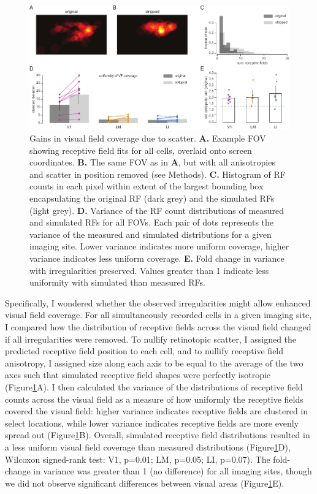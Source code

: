 \begin{figure}[t!]
    \includegraphics[width=\textwidth]{figures/chapter_3/fig_3-6_vf_coverage/fig_3-6_vf_coverage.pdf}
    \vspace{.1in}
    \caption[Compensatory visual field coverage]{Gains in visual field coverage due to scatter. 
    \textbf{A.} Example FOV showing receptive field fits for all cells, overlaid onto screen coordinates.
    \textbf{B.} The same FOV as in \textbf{A}, but with all anisotropies and scatter in position removed (see Methods). 
    \textbf{C.} Histogram of RF counts in each pixel within extent of the largest bounding box encapsulating the original RF (dark grey) and the simulated RFs (light grey).
    \textbf{D.} Variance of the RF count distributions of measured and simulated RFs for all FOVs. Each pair of dots represents the variance of the measured and simulated distributions for a given imaging site. Lower variance indicates more uniform coverage, higher variance indicates less uniform coverage.
    \textbf{E.} Fold change in variance with irregularities preserved. Values greater than 1 indicate less uniformity with simulated than measured RFs.
    \label{fig:vf_coverage}}
\end{figure}

Specifically, I wondered whether the observed irregularities might allow enhanced visual field coverage. For all simultaneously recorded cells in a given imaging site, I compared how the distribution of receptive fields across the visual field changed if all irregularities were removed. To nullify retinotopic scatter, I assigned the predicted receptive field position to each cell, and to nullify receptive field anisotropy, I assigned size along each axis to be equal to the average of the two axes such that simulated receptive field shapes were perfectly isotropic (Figure\ref{fig:vf_coverage}A). I then calculated the variance of the distributions of receptive field counts across the visual field as a measure of how uniformly the receptive fields covered the visual field:  higher variance indicates receptive fields are clustered in select locations, while lower variance indicates receptive fields are more evenly spread out (Figure\ref{fig:vf_coverage}B). Overall, simulated receptive field distributions resulted in a less uniform visual field coverage than measured distributions (Figure\ref{fig:vf_coverage}D), Wilcoxon signed-rank test: V1, p=0.01; LM, p=0.05; LI, p=0.07). The fold-change in variance was greater than 1 (no difference) for all imaging sites, though we did not observe significant differences between visual areas (Figure\ref{fig:vf_coverage}E). 


